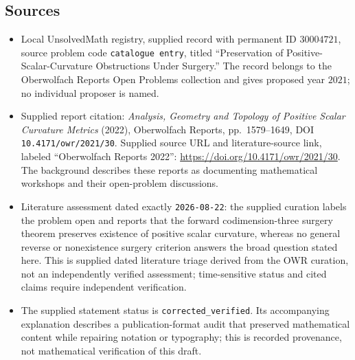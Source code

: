 \documentclass[11pt]{article}
\begin{document}
\subsection{Sources}
\begin{itemize}
\item Local UnsolvedMath registry, supplied record with permanent ID \(30004721\), source problem code \texttt{catalogue entry}, titled ``Preservation of Positive-Scalar-Curvature Obstructions Under Surgery.'' The record belongs to the Oberwolfach Reports Open Problems collection and gives proposed year \(2021\); no individual proposer is named.
\item Supplied report citation: \emph{Analysis, Geometry and Topology of Positive Scalar Curvature Metrics} (2022), Oberwolfach Reports, pp.\ 1579--1649, DOI \texttt{10.4171/owr/2021/30}. Supplied source URL and literature-source link, labeled ``Oberwolfach Reports 2022'': \url{https://doi.org/10.4171/owr/2021/30}. The background describes these reports as documenting mathematical workshops and their open-problem discussions.
\item Literature assessment dated exactly \texttt{2026-08-22}: the supplied curation labels the problem open and reports that the forward codimension-three surgery theorem preserves existence of positive scalar curvature, whereas no general reverse or nonexistence surgery criterion answers the broad question stated here. This is supplied dated literature triage derived from the OWR curation, not an independently verified assessment; time-sensitive status and cited claims require independent verification.
\item The supplied statement status is \texttt{corrected\_verified}. Its accompanying explanation describes a publication-format audit that preserved mathematical content while repairing notation or typography; this is recorded provenance, not mathematical verification of this draft.
\end{itemize}
\end{document}

